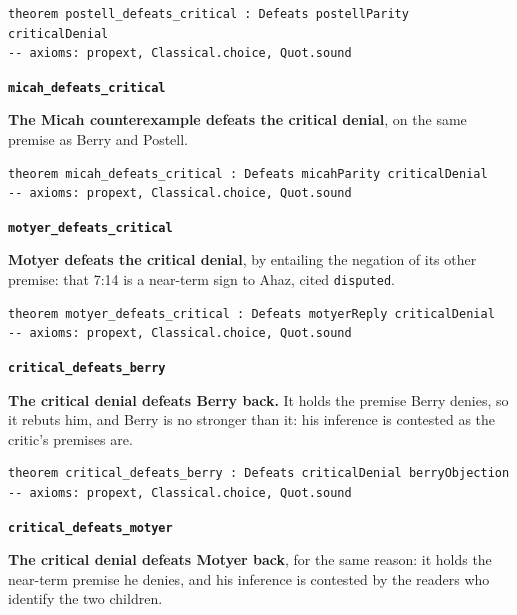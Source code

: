 \documentclass[11pt]{article}
\begin{document}
{\small\begin{verbatim}
theorem postell_defeats_critical : Defeats postellParity criticalDenial
-- axioms: propext, Classical.choice, Quot.sound
\end{verbatim}}
\par\medskip\noindent\textbf{\texttt{micah\_\allowbreak{}defeats\_\allowbreak{}critical}}\par\nobreak\noindent
\textbf{The Micah counterexample defeats the critical denial}, on the same premise as Berry and Postell.

{\small\begin{verbatim}
theorem micah_defeats_critical : Defeats micahParity criticalDenial
-- axioms: propext, Classical.choice, Quot.sound
\end{verbatim}}
\par\medskip\noindent\textbf{\texttt{motyer\_\allowbreak{}defeats\_\allowbreak{}critical}}\par\nobreak\noindent
\textbf{Motyer defeats the critical denial}, by entailing the negation of its other premise: that 7:14 is a near-term sign to Ahaz, cited \texttt{disputed}.

{\small\begin{verbatim}
theorem motyer_defeats_critical : Defeats motyerReply criticalDenial
-- axioms: propext, Classical.choice, Quot.sound
\end{verbatim}}
\par\medskip\noindent\textbf{\texttt{critical\_\allowbreak{}defeats\_\allowbreak{}berry}}\par\nobreak\noindent
\textbf{The critical denial defeats Berry back.} It holds the premise Berry denies, so it rebuts him, and Berry is no stronger than it: his inference is contested as the critic’s premises are.

{\small\begin{verbatim}
theorem critical_defeats_berry : Defeats criticalDenial berryObjection
-- axioms: propext, Classical.choice, Quot.sound
\end{verbatim}}
\par\medskip\noindent\textbf{\texttt{critical\_\allowbreak{}defeats\_\allowbreak{}motyer}}\par\nobreak\noindent
\textbf{The critical denial defeats Motyer back}, for the same reason: it holds the near-term premise he denies, and his inference is contested by the readers who identify the two children.
\end{document}
